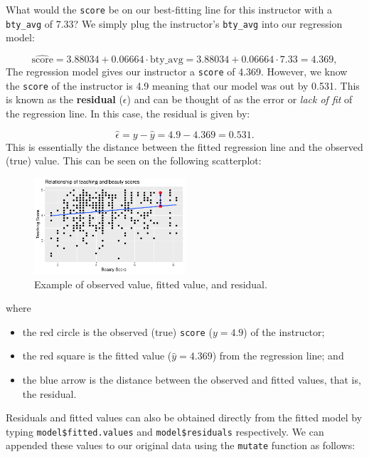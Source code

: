 \documentclass[
  letterpaper,
  DIV=11,
  numbers=noendperiod]{scrartcl}
\providecommand{\tightlist}{%
  \setlength{\itemsep}{0pt}\setlength{\parskip}{0pt}}\usepackage{longtable,booktabs,array}
\begin{document}
What would the \texttt{score} be on our best-fitting line for this
instructor with a \texttt{bty\_avg} of 7.33? We simply plug the
instructor's \texttt{bty\_avg} into our regression model:

\[\widehat{\mbox{score}} = 3.88034 + 0.06664 \cdot \mbox{bty\_avg} = 3.88034 + 0.06664 \cdot 7.33 = 4.369,\]
The regression model gives our instructor a \texttt{score} of 4.369.
However, we know the \texttt{score} of the instructor is 4.9 meaning
that our model was out by 0.531. This is known as the \textbf{residual}
(\(\epsilon\)) and can be thought of as the error or \emph{lack of fit}
of the regression line. In this case, the residual is given by:

\[ \widehat{\epsilon} = y - \widehat{y} = 4.9 - 4.369 = 0.531.\]This is
essentially the distance between the fitted regression line and the
observed (true) value. This can be seen on the following scatterplot:

\begin{figure}[H]

{\centering \includegraphics[width=0.5\textwidth,height=\textheight]{index_files/figure-pdf/lm3-1.pdf}

}

\caption{Example of observed value, fitted value, and residual.}

\end{figure}%

where

\begin{itemize}
\tightlist
\item
  the red circle is the observed (true) \texttt{score} (\(y=4.9\)) of
  the instructor;
\item
  the red square is the fitted value (\(\widehat{y} = 4.369\)) from the
  regression line; and
\item
  the blue arrow is the distance between the observed and fitted values,
  that is, the residual.
\end{itemize}

Residuals and fitted values can also be obtained directly from the
fitted model by typing \texttt{model\$fitted.values} and
\texttt{model\$residuals} respectively. We can appended these values to
our original data using the \texttt{mutate} function as follows:
\end{document}
